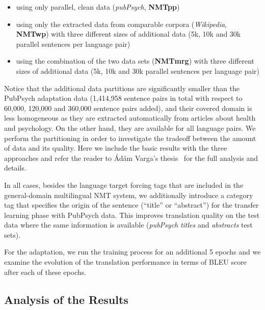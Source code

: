 \documentclass[a4paper,11pt]{article}
\begin{document}
\begin{itemize}
\itemsep0.2em
	\item\label{i:pp} using only parallel, clean data (\textit{pubPsych}, {\bf NMTpp})
	\item using only the extracted data from comparable corpora (\textit{Wikipedia}, {\bf NMTwp}) with three different sizes of additional data (5k, 10k and 30k parallel sentences per language pair)
	\item using the combination of the two data sets ({\bf NMTmrg}) with three different sizes of additional data (5k, 10k and 30k parallel sentences per language pair)
\end{itemize}

Notice that the additional data partitions are significantly smaller than the PubPsych adaptation data (1,414,958 sentence pairs in total with respect to 60,000, 120,000 and 360,000 sentence pairs added), and their covered domain is less homogeneous as they are extracted automatically from articles about health and psychology. On the other hand, they are available for all language pairs. We perform the partitioning in order to investigate the tradeoff between the amount of data and its quality.
Here we include the basic results with the three approaches and refer the reader to \'Ad\'am Varga's thesis~\cite{tesisAdam} for the full analysis and details.

In all cases, besides the language target forcing tags that are included in the general-domain multilingual NMT system, we additionally introduce a category tag that specifies the origin of the sentence (``title'' or ``abstract'') for the transfer learning phase with PubPsych data. This improves translation quality on the test data where the same information is available (\textit{pubPsych} \textit{titles} and \textit{abstracts} test sets).

For the adaptation, we run the training process for an additional 5 epochs and we examine the evolution of the translation performance in terms of BLEU score after each of these epochs. 

\subsection{Analysis of the Results}
\label{ss:nmtResults}
\end{document}
